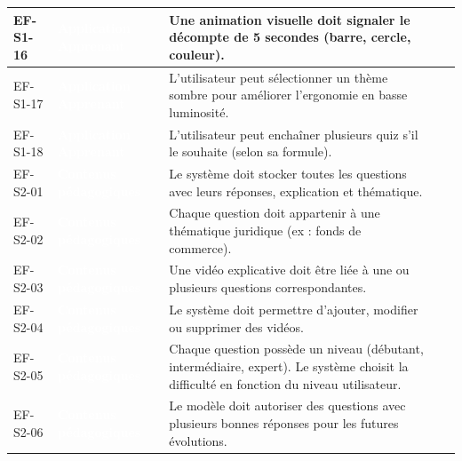 \begin{longtable}{|P{1.75cm}|P{2.65cm}|P{7.45cm}|P{1.80cm}|P{1.55cm}|}
EF-S1-16 & \textcolor{white}{\textbf{Application Apprenant}} & Une animation visuelle doit signaler le décompte de 5 secondes (barre, cercle, couleur). &  &  \\ \hline
EF-S1-17 & \textcolor{white}{\textbf{Application Apprenant}} & L’utilisateur peut sélectionner un thème sombre pour améliorer l’ergonomie en basse luminosité. &  &  \\ \hline
EF-S1-18 & \textcolor{white}{\textbf{Application Apprenant}} & L’utilisateur peut enchaîner plusieurs quiz s’il le souhaite (selon sa formule). &  &  \\ \hline
EF-S2-01 & \textcolor{white}{\textbf{Contenus pédagogiques}} & Le système doit stocker toutes les questions avec leurs réponses, explication et thématique. &  &  \\ \hline
EF-S2-02 & \textcolor{white}{\textbf{Contenus pédagogiques}} & Chaque question doit appartenir à une thématique juridique (ex : fonds de commerce). &  &  \\ \hline
EF-S2-03 & \textcolor{white}{\textbf{Contenus pédagogiques}} & Une vidéo explicative doit être liée à une ou plusieurs questions correspondantes. &  &  \\ \hline
EF-S2-04 & \textcolor{white}{\textbf{Contenus pédagogiques}} & Le système doit permettre d’ajouter, modifier ou supprimer des vidéos. &  &  \\ \hline
EF-S2-05 & \textcolor{white}{\textbf{Contenus pédagogiques}} & Chaque question possède un niveau (débutant, intermédiaire, expert). Le système choisit la difficulté en fonction du niveau utilisateur. &  &  \\ \hline
EF-S2-06 & \textcolor{white}{\textbf{Contenus pédagogiques}} & Le modèle doit autoriser des questions avec plusieurs bonnes réponses pour les futures évolutions. &  &  \\ \hline

\end{longtable}
